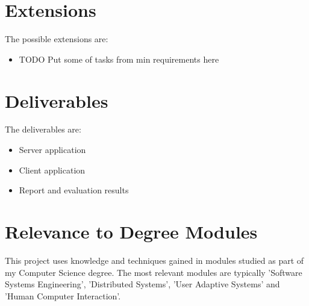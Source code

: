 
\section{Extensions}

The possible extensions are:

\begin{itemize}
	\item TODO Put some of tasks from min requirements here
\end{itemize}


\section{Deliverables}

The deliverables are:

\begin{itemize}
	\item Server application
	\item Client application
	\item Report and evaluation results
\end{itemize}


\section{Relevance to Degree Modules}

This project uses knowledge and techniques gained in modules studied as part of my Computer Science degree. The most relevant modules are typically 'Software Systems Engineering', 'Distributed Systems', 'User Adaptive Systems' and 'Human Computer Interaction'.

